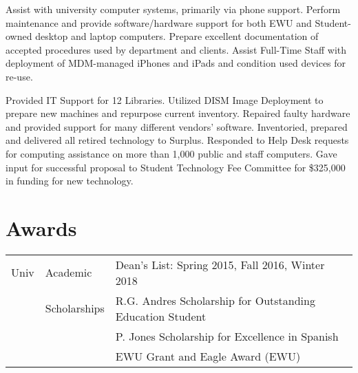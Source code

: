 \documentclass[]{deedy-resume-openfont}
\begin{document}
\begin{minipage}[t]{0.66\textwidth}
Assist with university computer systems, primarily via phone support. Perform maintenance and provide software/hardware support for both EWU and Student-owned desktop and laptop computers. Prepare excellent documentation of accepted procedures used by department and clients. Assist Full-Time Staff with deployment of MDM-managed iPhones and iPads and condition used devices for re-use.

\sectionsep

Provided IT Support for 12 Libraries. Utilized DISM Image Deployment to prepare new machines and repurpose current inventory. Repaired faulty hardware and provided support for many different vendors’ software. Inventoried, prepared and delivered all retired technology to Surplus. Responded to Help Desk requests for computing assistance on more than 1,000 public and staff computers. Gave input for successful proposal to Student Technology Fee Committee for \$325,000 in funding for new technology.
\sectionsep


\section{Awards} 
\begin{tabular}{rll}
Univ& Academic & Dean's List: Spring 2015, Fall 2016, Winter 2018\\
 & Scholarships & R.G. Andres Scholarship for Outstanding Education Student\\
 & & P. Jones Scholarship for Excellence in Spanish\\
 & & EWU Grant and Eagle Award (EWU)\\



\end{tabular}
\end{minipage}
\end{document}
